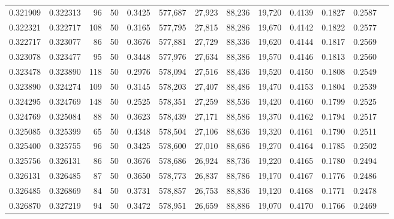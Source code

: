 \begin{tabular}{rrrrrrrrrrrrr}
0.321909 & 0.322313 &    96 &  50 &                                     0.3425 & 577,687 &  27,923 &  88,236 &  19,720 & 0.4139 & 0.1827 & 0.2587 \\
0.322321 & 0.322717 &   108 &  50 &                                     0.3165 & 577,795 &  27,815 &  88,286 &  19,670 & 0.4142 & 0.1822 & 0.2577 \\
0.322717 & 0.323077 &    86 &  50 &                                     0.3676 & 577,881 &  27,729 &  88,336 &  19,620 & 0.4144 & 0.1817 & 0.2569 \\
0.323078 & 0.323477 &    95 &  50 &                                     0.3448 & 577,976 &  27,634 &  88,386 &  19,570 & 0.4146 & 0.1813 & 0.2560 \\
0.323478 & 0.323890 &   118 &  50 &                                     0.2976 & 578,094 &  27,516 &  88,436 &  19,520 & 0.4150 & 0.1808 & 0.2549 \\
0.323890 & 0.324274 &   109 &  50 &                                     0.3145 & 578,203 &  27,407 &  88,486 &  19,470 & 0.4153 & 0.1804 & 0.2539 \\
0.324295 & 0.324769 &   148 &  50 &                                     0.2525 & 578,351 &  27,259 &  88,536 &  19,420 & 0.4160 & 0.1799 & 0.2525 \\
0.324769 & 0.325084 &    88 &  50 &                                     0.3623 & 578,439 &  27,171 &  88,586 &  19,370 & 0.4162 & 0.1794 & 0.2517 \\
0.325085 & 0.325399 &    65 &  50 &                                     0.4348 & 578,504 &  27,106 &  88,636 &  19,320 & 0.4161 & 0.1790 & 0.2511 \\
0.325400 & 0.325755 &    96 &  50 &                                     0.3425 & 578,600 &  27,010 &  88,686 &  19,270 & 0.4164 & 0.1785 & 0.2502 \\
0.325756 & 0.326131 &    86 &  50 &                                     0.3676 & 578,686 &  26,924 &  88,736 &  19,220 & 0.4165 & 0.1780 & 0.2494 \\
0.326131 & 0.326485 &    87 &  50 &                                     0.3650 & 578,773 &  26,837 &  88,786 &  19,170 & 0.4167 & 0.1776 & 0.2486 \\
0.326485 & 0.326869 &    84 &  50 &                                     0.3731 & 578,857 &  26,753 &  88,836 &  19,120 & 0.4168 & 0.1771 & 0.2478 \\
0.326870 & 0.327219 &    94 &  50 &                                     0.3472 & 578,951 &  26,659 &  88,886 &  19,070 & 0.4170 & 0.1766 & 0.2469 \\

\end{tabular}

